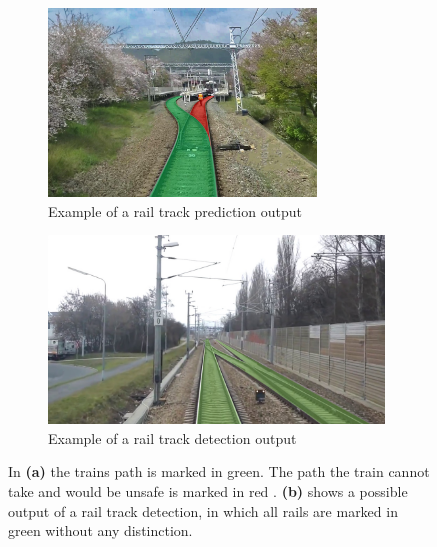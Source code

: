 
\vspace{0.5cm} %


\begin{figure}[H]
    \centering
    \begin{subfigure}{0.48\textwidth}
        \includegraphics[width=\linewidth, height=5cm, keepaspectratio]{PICs/Introduction/train-ego-path.png}
        \caption{Example of a rail track prediction output \cite{tepNet2024}}
        \label{fig:train-ego-path}
    \end{subfigure}
    \hfill
    \begin{subfigure}{0.48\textwidth}
        \includegraphics[width=\linewidth, height=5cm]{PICs/Introduction/railTrackDetection.jpg} %
        \caption{Example of a rail track detection output \cite{railsem19dataset}}
        \label{fig:railTrackDetection}
    \end{subfigure}
    \caption{In \textbf{(a)} the trains path is marked in green. The path the train cannot take and would be unsafe is marked in red \cite{tepNet2024}. \textbf{(b)} shows a possible output of a rail track detection, in which all rails are marked in green without any distinction.}
    \label{fig:comparisonRailTrackDetectionVSPrediction}
\end{figure}

